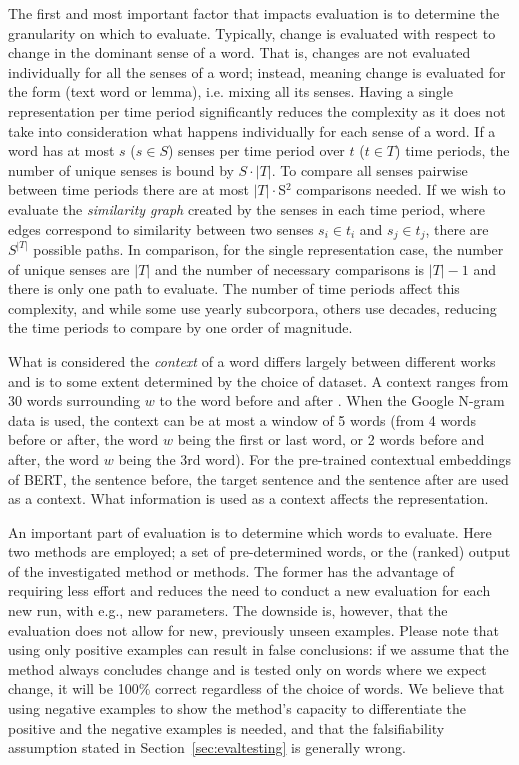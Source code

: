 \documentclass[output=paper]{langsci/langscibook}
\begin{document}
    
The first and most important factor that impacts evaluation is to determine the granularity on which to evaluate. Typically, change is evaluated with respect to change in the dominant sense of a word. That is, changes are not evaluated individually for all the senses of a word; instead, meaning change is evaluated for the form (text word or lemma), i.e. mixing all its senses. 
    Having a single representation per time period significantly reduces the complexity as it does not take into consideration what happens individually for each sense of a word. If a word has at most $s$ ($s\in S$) senses per time period over $t$ ($t \in T$) time periods, the number of unique senses is bound by $S\cdot |T|$. To compare all senses pairwise between time periods there are at most $|T|\cdot$S$^2$ comparisons needed. If we wish to evaluate the \textit{similarity graph} created by the senses in each time period, where edges correspond to similarity between two senses $s_i \in t_i$ and $s_j \in t_j$, there are $S^{|T|}$ possible paths. In comparison, for the single representation case, the number of unique senses are $|T|$ and the number of necessary comparisons is $|T|-1$  
    and there is only one path to evaluate. The number of time periods affect this complexity, and while some use yearly subcorpora, others use decades, reducing the time periods to compare by one order of magnitude. 
    
    
What is considered the \textit{context} of a word differs largely between different works and is to some extent determined by the choice of dataset. A context ranges from 30 words surrounding $w$ \citep{sagi-etal-2009-semantic} to the word before and after \citep{gulordava-baroni-2011-distributional}. When the Google N-gram data is used, the context can be at most a window of 5 words (from 4 words before or after, the word $w$ being the first or last word, or 2 words before and after, the word $w$ being the 3rd word). For the pre-trained contextual embeddings of BERT, the sentence before, the target sentence and the sentence after are used as a context. What information is used as a context affects the representation. 

An important part of evaluation is to determine which words to evaluate. Here two methods are employed; a set of pre-determined words, or the (ranked) output of the investigated method or methods.
	The former has the advantage of requiring less effort and reduces the need to conduct a new evaluation for each new run, with e.g., new parameters. The downside is, however, that the evaluation does not allow for new, previously unseen examples. Please note that using only positive examples can result in false conclusions: if we assume that the method always concludes change and is tested only on words where we expect change, it will be 100\% correct regardless of the choice of words. We believe that using negative examples to show the method's capacity to differentiate the positive and the negative examples is needed, and that the falsifiability assumption stated in Section~\ref{sec:evaltesting} is generally wrong.   
	
\end{document}
